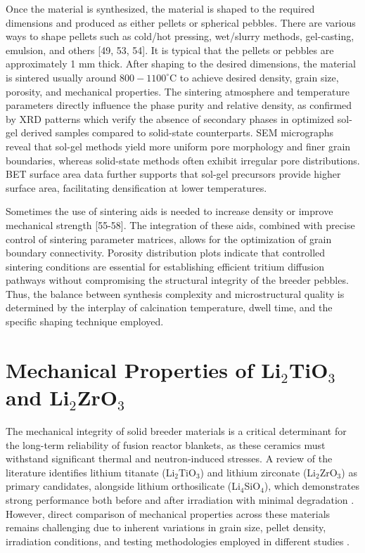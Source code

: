 \documentclass[review,12pt,a4paper]{elsarticle}
\begin{document}
\textcolor{medconf}{Once the material is synthesized, the material is shaped to the required dimensions and produced as either pellets or spherical pebbles. There are various ways to shape pellets such as cold/hot pressing, wet/slurry methods, gel-casting, emulsion, and others [49, 53, 54]. It is typical that the pellets or pebbles are approximately 1 mm thick. After shaping to the desired dimensions, the material is sintered usually around $800-1100^{\circ}\mathrm{C}$ to achieve desired density, grain size, porosity, and mechanical properties. The sintering atmosphere and temperature parameters directly influence the phase purity and relative density, as confirmed by XRD patterns which verify the absence of secondary phases in optimized sol-gel derived samples compared to solid-state counterparts. SEM micrographs reveal that sol-gel methods yield more uniform pore morphology and finer grain boundaries, whereas solid-state methods often exhibit irregular pore distributions. BET surface area data further supports that sol-gel precursors provide higher surface area, facilitating densification at lower temperatures.}

\textcolor{medconf}{Sometimes the use of sintering aids is needed to increase density or improve mechanical strength [55-58]. The integration of these aids, combined with precise control of sintering parameter matrices, allows for the optimization of grain boundary connectivity. Porosity distribution plots indicate that controlled sintering conditions are essential for establishing efficient tritium diffusion pathways without compromising the structural integrity of the breeder pebbles. Thus, the balance between synthesis complexity and microstructural quality is determined by the interplay of calcination temperature, dwell time, and the specific shaping technique employed.}

\section*{Mechanical Properties of Li$_{2}$TiO$_{3}$ and Li$_{2}$ZrO$_{3}$}


\textcolor{medconf}{The mechanical integrity of solid breeder materials is a critical determinant for the long-term reliability of fusion reactor blankets, as these ceramics must withstand significant thermal and neutron-induced stresses. A review of the literature identifies lithium titanate (Li$_{2}$TiO$_{3}$) and lithium zirconate (Li$_{2}$ZrO$_{3}$) as primary candidates, alongside lithium orthosilicate (Li$_{4}$SiO$_{4}$), which demonstrates strong performance both before and after irradiation with minimal degradation \citep{tan_scalable_2025}. However, direct comparison of mechanical properties across these materials remains challenging due to inherent variations in grain size, pellet density, irradiation conditions, and testing methodologies employed in different studies \citep{tan_scalable_2025}.}
\end{document}

